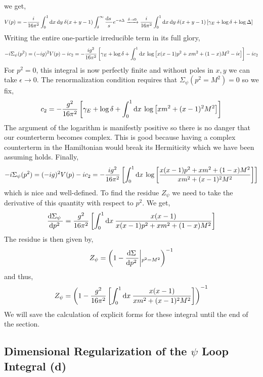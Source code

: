 \documentclass{article}
\begin{document}
we get,
\begin{align*}
V(p) & = -\frac{i}{16 \pi^2} \int_{0}^{1} \mathrm{d}x \: \mathrm{d}y \: \delta(x + y - 1) \int_{\delta}^\infty \frac{\mathrm{d}s \:}{s} e^{ - s \Delta } \xrightarrow{\delta \to 0} \frac{i}{16 \pi^2} \int_{0}^{1} \mathrm{d}x \: \mathrm{d}y \:  \delta(x + y - 1) \left[ \gamma_E + \log{\delta} + \log{\Delta} \right]
\end{align*} 
Writing the entire one-particle irreducible term in its full glory,
\[ - i \Sigma_\psi(p^2) = (-ig)^2 V(p) - i c_2 = -\frac{ig^2}{16 \pi^2} \left[\gamma_E + \log{\delta} + \int_{0}^{1} \mathrm{d}x \: \log{\left[ x(x - 1) p^2 + x m^2 + (1 - x) M^2 - i \epsilon \right]} \right] - i c_2 \]
For $p^2 = 0$, this integral is now perfectly finite and without poles in $x, y$ we can take $\epsilon \to 0$. The renormalization condition requires that $\Sigma_\psi(p^2 = M^2) = 0$ so we fix,
\[ c_2 = -\frac{g^2}{16 \pi^2} \left[ \gamma_E + \log{\delta} + \int_{0}^{1} \mathrm{d}x \:   \log{\left[ x m^2 + (x - 1)^2 M^2 \right]} \right] \]
The argument of the logarithm is manifestly positive so there is no danger that our counterterm becomes complex. This is good because having a complex counterterm in the Hamiltonian would break its Hermiticity which we have been assuming holds.
Finally,
\[ - i \Sigma_\psi(p^2) = (-ig)^2 V(p) - i c_2 = -\frac{ig^2}{16 \pi^2} \left[ \int_{0}^{1} \mathrm{d}x \: \log{\left[\frac{ x(x - 1) p^2 + x m^2 + (1 - x) M^2}{x m^2 + (x - 1)^2 M^2} \right]} \right] \]
which is nice and well-defined. To find the residue $Z_\psi$ we need to take the derivative of this quantity with respect to $p^2$. We get,
\[ \frac{\mathrm{d}\Sigma_\psi \:}{\mathrm{d}p^2 \:} = \frac{g^2}{16 \pi^2} \left[ \int_{0}^{1} \mathrm{d}x \: \frac{x(x - 1)}{ x(x - 1) p^2 + x m^2 + (1 - x) M^2} \right] \] 
The residue is then given by,
\[ Z_\psi = \left(1 - \frac{\mathrm{d}\Sigma \:}{\mathrm{d}p^2 \:} \middle|_{p^2 = M^2} \right)^{-1}\]
and thus,
\[ Z_\psi = \left(1 -  \frac{g^2}{16 \pi^2} \left[ \int_{0}^{1} \mathrm{d}x \: \frac{x(x - 1)}{ x m^2 + (x - 1)^2 M^2} \right] \right)^{-1}\]
We will save the calculation of explicit forms for these integral until the end of the section.
 
\subsection{Dimensional Regularization of the $\psi$ Loop Integral (d)}
\end{document}
